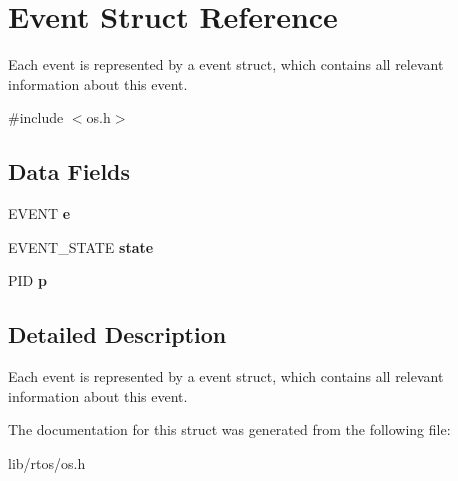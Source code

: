 \hypertarget{structEvent}{}\section{Event Struct Reference}
\label{structEvent}


Each event is represented by a event struct, which contains all relevant information about this event.  




{\ttfamily \#include $<$os.\+h$>$}

\subsection*{Data Fields}
\begin{DoxyCompactItemize}
\item 
\hypertarget{structEvent_a72b1a161a01664389f12b4b95b34e74a}{}E\+V\+E\+N\+T {\bfseries e}\label{structEvent_a72b1a161a01664389f12b4b95b34e74a}

\item 
\hypertarget{structEvent_af873faa7412e73fb201823021c2a31a3}{}E\+V\+E\+N\+T\+\_\+\+S\+T\+A\+T\+E {\bfseries state}\label{structEvent_af873faa7412e73fb201823021c2a31a3}

\item 
\hypertarget{structEvent_a6633dfc5be0e66462249935d032688b5}{}P\+I\+D {\bfseries p}\label{structEvent_a6633dfc5be0e66462249935d032688b5}

\end{DoxyCompactItemize}


\subsection{Detailed Description}
Each event is represented by a event struct, which contains all relevant information about this event. 

The documentation for this struct was generated from the following file\+:\begin{DoxyCompactItemize}
\item 
lib/rtos/os.\+h\end{DoxyCompactItemize}
